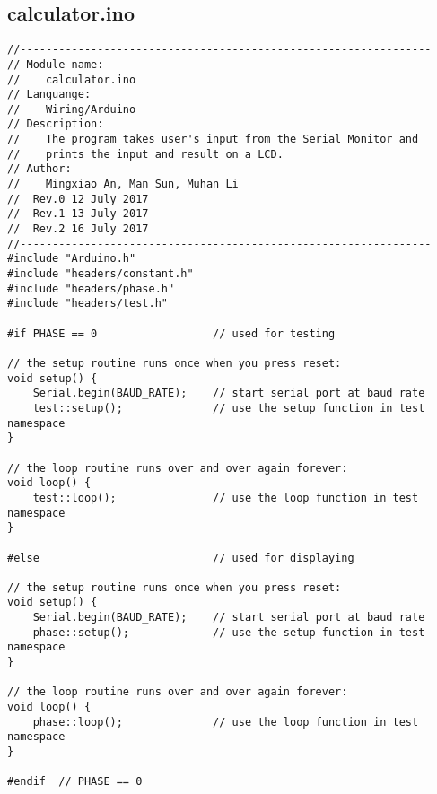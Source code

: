 \subsection{calculator.ino}
\begin{verbatim}
//----------------------------------------------------------------
// Module name:
//    calculator.ino
// Languange:
//    Wiring/Arduino
// Description:
//    The program takes user's input from the Serial Monitor and
//    prints the input and result on a LCD.
// Author:
//    Mingxiao An, Man Sun, Muhan Li
//  Rev.0 12 July 2017
//  Rev.1 13 July 2017
//  Rev.2 16 July 2017
//----------------------------------------------------------------
#include "Arduino.h"
#include "headers/constant.h"
#include "headers/phase.h"
#include "headers/test.h"

#if PHASE == 0                  // used for testing

// the setup routine runs once when you press reset:
void setup() {
    Serial.begin(BAUD_RATE);    // start serial port at baud rate
    test::setup();              // use the setup function in test namespace
}

// the loop routine runs over and over again forever:
void loop() {
    test::loop();               // use the loop function in test namespace
}

#else                           // used for displaying

// the setup routine runs once when you press reset:
void setup() {
    Serial.begin(BAUD_RATE);    // start serial port at baud rate
    phase::setup();             // use the setup function in test namespace
}

// the loop routine runs over and over again forever:
void loop() {
    phase::loop();              // use the loop function in test namespace
}

#endif  // PHASE == 0
\end{verbatim}

